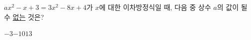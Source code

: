 $ax^2-x+3=3x^2-8x+4$가 $x$에 대한 이차방정식일 때, 다음 중 상수 $a$의 값이 될 수 \underline{없는} 것은?
\begin{choices32}{$-3$}{$-1$}{$0$}{$1$}{$3$}\end{choices32}
